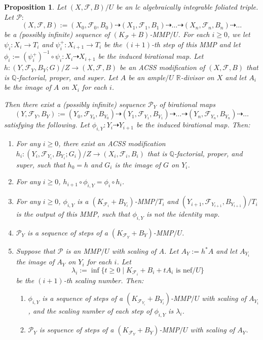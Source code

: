 \documentclass[11pt]{amsart}
\numberwithin{equation}{section}
\newcommand{\Qq}{\mathbb{Q}}
\newcommand{\Rr}{\mathbb{R}}
\newcommand{\Ff}{\mathcal{F}}
\newtheorem{prop}[thm]{Proposition}
\theoremstyle{definition}
\theoremstyle{definition}
\theoremstyle{definition}
\begin{document}
\begin{prop}\label{prop: lift mmp}
    Let $(X,\Ff,B)/U$ be an lc algebraically integrable foliated triple. Let $\mathcal{P}:$
$$(X,\Ff,B):=(X_0,\Ff_0,B_0)\dashrightarrow (X_1,\Ff_1,B_1)\dashrightarrow\dots\dashrightarrow (X_n,\Ff_n,B_n)\dashrightarrow\dots$$
be a (possibly infinite) sequence of $(K_{\Ff}+B)$-MMP$/U$. For each $i\geq 0$, we let $\psi_i: X_i\rightarrow T_i$ and $\psi_i^+:X_{i+1}\rightarrow T_{i}$ be the $(i+1)$-th step of this MMP and let $\phi_i:=(\psi_{i}^+)^{-1}\circ\psi_i: X_i\dashrightarrow X_{i+1}$ be the induced birational map. Let $h: (Y,\Ff_Y,B_Y;G)/Z\rightarrow (X,\Ff,B)$ be an ACSS modification of $(X,\Ff,B)$ that is $\Qq$-factorial, proper, and super. Let $A$ be an ample$/U$ $\Rr$-divisor on $X$ and let $A_i$ be the image of $A$ on $X_i$ for each $i$.

Then there exist a (possibly infinite) sequence $\mathcal{P}_Y$ of birational maps 
$$(Y,\Ff_Y,B_Y):=(Y_0,\Ff_{Y_0},B_{Y_0})\dashrightarrow (Y_1,\Ff_{Y_1},B_{Y_1})\dashrightarrow\dots\dashrightarrow (Y_n,\Ff_{Y_n},B_{Y_n})\dashrightarrow\dots$$
satisfying the following. Let $\phi_{i,Y}: Y_i\dashrightarrow Y_{i+1}$ be the induced birational map. Then:
\begin{enumerate}
\item For any $i\geq 0$, there exist an ACSS modification $h_i: (Y_i,\Ff_{Y_i},B_{Y_i};G_i)/Z\rightarrow (X_i,\Ff_i,B_i)$ that is $\Qq$-factorial, proper, and super, such that $h_0=h$ and $G_i$ is the image of $G$ on $Y_i$.
\item For any $i\geq 0$, $h_{i+1}\circ\phi_{i,Y}=\phi_i\circ h_i$.
\item For any $i\geq 0$, $\phi_{i,Y}$ is a $(K_{\Ff_i}+B_{Y_i})$-MMP$/T_i$ and $(Y_{i+1},\Ff_{Y_{i+1}},B_{Y_{i+1}})/T_i$ is the output of this MMP, such that $\phi_{i,Y}$ is not the identity map.
\item $\mathcal{P}_Y$ is a sequence of steps of a $(K_{\Ff_Y}+B_Y)$-MMP$/U$.
\item Suppose that $\mathcal{P}$ is an MMP$/U$ with scaling of $A$. Let $A_{Y}:=h^*A$ and let $A_{Y_i}$ the image of $A_Y$ on $Y_i$ for each $i$. Let
$$\lambda_i:=\inf\{t\geq 0\mid K_{\Ff_i}+B_i+tA_i\text{ is nef}/U\}$$
be the $(i+1)$-th scaling number. Then:
\begin{enumerate}
    \item $\phi_{i,Y}$ is a sequence of steps of a $(K_{\Ff_{Y_i}}+B_{Y_i})$-MMP$/U$ with scaling of $A_{Y_i}$, and the scaling number of each step of $\phi_{i,Y}$ is $\lambda_i$.
    \item $\mathcal{P}_Y$ is sequence of steps of a $(K_{\Ff_Y}+B_Y)$-MMP$/U$ with scaling of $A_Y$.
\end{enumerate}
\end{enumerate}
\end{prop}
\end{document}

